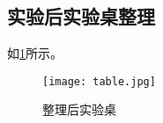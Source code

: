 \documentclass[dvipsnames, svgnames,a4paper,11pt]{article}
\begin{document}
			

	
\subsection{实验后实验桌整理}

如\cref{fig:table}所示。

\begin{figure}[htbp]
	\centering
	\texttt{[image: table.jpg]}
	
	\caption{整理后实验桌}
	\label{fig:table}
\end{figure}
	
\end{document}

